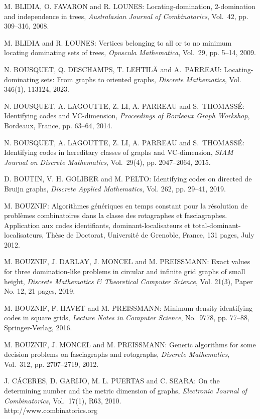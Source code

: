 \begin{thebibliography}{999}
M. BLIDIA, O. FAVARON and R. LOUNES: Locating-domination, 2-domination and
independence in trees, {\it Australasian Journal of Combinatorics}, Vol.~42, pp.
309--316, 2008.

M. BLIDIA and R. LOUNES: Vertices belonging to all or to no minimum locating dominating sets of trees, {\it Opuscula Mathematica}, Vol.~29, pp. 5--14, 2009.

N. BOUSQUET, Q. DESCHAMPS, T. LEHTIL\"A and A.~PARREAU: Locating-dominating sets: {F}rom graphs to oriented graphs, {\it Discrete Mathematics}, Vol. 346(1), 113124, 2023.

N. BOUSQUET, A. LAGOUTTE, Z. LI, A. PARREAU and S.~THO\-MASS\'E: Identifying codes and VC-dimension, {\it Proceedings of Bordeaux Graph Workshop}, Bordeaux, France, pp. 63--64, 2014.

N. BOUSQUET, A. LAGOUTTE, Z. LI, A. PARREAU and S.~THO\-MASS\'E: Identifying codes in hereditary classes of graphs and VC-dimension, {\it SIAM Journal on Discrete Mathematics}, Vol.~29(4), pp. 2047--2064, 2015.

D. BOUTIN, V. H. GOLIBER and M. PELTO: Identifying codes on directed de Bruijn graphs, {\it Discrete Applied Mathematics}, Vol. 262, pp. 29--41, 2019.

M. BOUZNIF: Algorithmes g\'en\'eriques en temps constant pour la r\'eso\-lution de probl\`emes combinatoires dans la classe des rotagraphes et fasciagraphes. Application aux codes identifiants, dominant-localisateurs et total-dominant-localisateurs, Th\`ese de Doctorat, Universit\'e de Grenoble, France, 131 pages, July 2012.

M. BOUZNIF, J. DARLAY, J. MONCEL and M. PREISSMANN: Exact values for three domination-like problems in circular and infinite grid graphs of small height, {\it Discrete Mathematics \& Theoretical Computer Science}, Vol. 21(3), Paper No. 12, 21 pages, 2019.

M. BOUZNIF, F. HAVET and M. PREISSMANN: Minimum-density identifying codes in square grids, {\it Lecture Notes in Computer Science}, No.~9778, pp. 77--88, Springer-Verlag, 2016.

M. BOUZNIF, J. MONCEL and M. PREISSMANN: Generic algorithms for some decision problems on fasciagraphs and rotagraphs, {\it Discrete Mathematics}, Vol.~312, pp. 2707--2719, 2012.

J. C\'ACERES, D. GARIJO, M. L. PUERTAS and C. SEARA: On the determining number and the metric dimension of graphs, {\it Electronic Journal of Combinatorics}, Vol.~17(1), R63, 2010.\\
http://www.combinatorics.org


\end{thebibliography}
